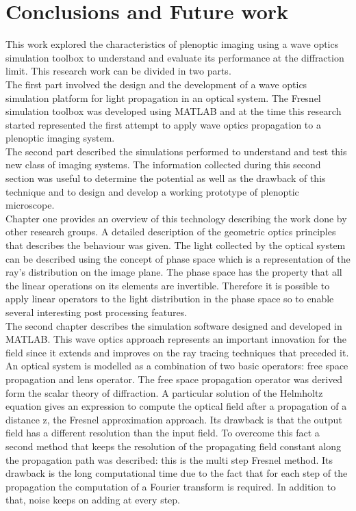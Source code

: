 \chapter{Conclusions and Future work}
This work explored the characteristics of plenoptic imaging using a wave optics simulation toolbox to understand and evaluate its performance at the diffraction limit.
This research work can be divided in two parts. \\
The first part involved the design and the development of a wave optics simulation platform for light propagation in an optical system. The Fresnel simulation toolbox was developed using MATLAB and at the time this research started represented the first attempt to apply wave optics propagation to a plenoptic imaging system.\\ 
The second part described the simulations performed to understand and test this new class of imaging systems. The information collected during this
second section was useful to determine the potential as well as the drawback of
this technique and to design and develop a working prototype of plenoptic microscope. \\ 
Chapter one provides an overview of this technology describing the work done by other research groups. A detailed description of the geometric optics principles that describes the behaviour was given. The light collected by the optical system can be described using the concept of phase space which is a representation of the ray's distribution on the image plane. The phase space has the property that all the linear operations on its elements are invertible. Therefore it is possible to apply linear operators to the light distribution in the phase space so to enable several interesting post processing features.\\
The second chapter describes the simulation software designed and developed in MATLAB. This wave optics approach represents an important innovation for the field since it extends and improves on the ray tracing techniques that preceded it. An optical system is modelled as a combination of two basic operators: free space propagation and lens operator. The free space propagation operator was derived form the scalar theory of diffraction. A particular solution of the Helmholtz equation gives an expression to compute the optical field after a propagation of a distance z, the Fresnel approximation approach. Its drawback is that the output field has a different resolution than the input field. To overcome this fact a second method that keeps the resolution of the propagating field constant along the propagation path was described: this is the multi step Fresnel method. Its drawback is the long computational time due to the fact that for each step of the propagation the computation of a Fourier transform is required. In addition to that, noise keeps on adding at every step.\\
